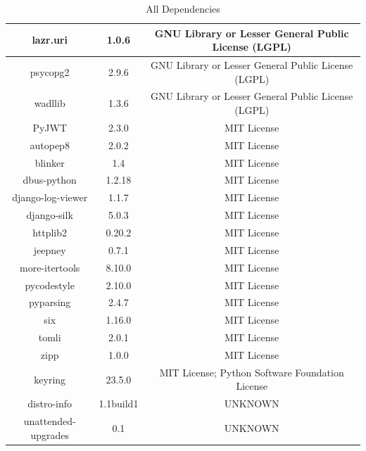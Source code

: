 \begin{table}[ht]
{\begin{tabular}{|c|c|c|}
lazr.uri            & 1.0.6            & GNU Library or Lesser General Public License (LGPL)     \\ \hline
psycopg2            & 2.9.6            & GNU Library or Lesser General Public License (LGPL)     \\ \hline
wadllib             & 1.3.6            & GNU Library or Lesser General Public License (LGPL)     \\ \hline
PyJWT               & 2.3.0            & MIT License                                             \\ \hline
autopep8            & 2.0.2            & MIT License                                             \\ \hline
blinker             & 1.4              & MIT License                                             \\ \hline
dbus-python         & 1.2.18           & MIT License                                             \\ \hline
django-log-viewer   & 1.1.7            & MIT License                                             \\ \hline
django-silk         & 5.0.3            & MIT License                                             \\ \hline
httplib2            & 0.20.2           & MIT License                                             \\ \hline
jeepney             & 0.7.1            & MIT License                                             \\ \hline
more-itertools      & 8.10.0           & MIT License                                             \\ \hline
pycodestyle         & 2.10.0           & MIT License                                             \\ \hline
pyparsing           & 2.4.7            & MIT License                                             \\ \hline
six                 & 1.16.0           & MIT License                                             \\ \hline
tomli               & 2.0.1            & MIT License                                             \\ \hline
zipp                & 1.0.0            & MIT License                                             \\ \hline
keyring             & 23.5.0           & MIT License; Python Software Foundation License         \\ \hline
distro-info         & 1.1build1        & UNKNOWN                                                 \\ \hline
unattended-upgrades & 0.1              & UNKNOWN                                                 \\ \hline
\end{tabular}%
}
\caption{All Dependencies}
\label{tab:dependencies}
\end{table}

